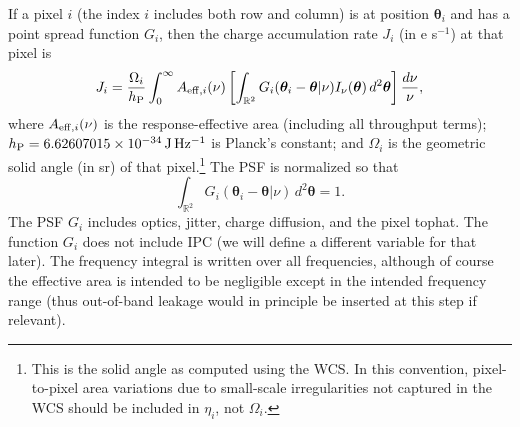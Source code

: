 \documentclass[prd,onecolumn,nofootinbib,nobibnotes]{revtex4}
\begin{document}
If a pixel $i$ (the index $i$ includes both row and column) is at position ${\boldsymbol\theta}_i$ and has a point spread function $G_i$, then the charge accumulation rate $J_i$ (in e s$^{-1}$) at that pixel is
\begin{equation}
J_i = \frac{\Omega_i}{h_{\rm P}} \int_0^\infty A_{{\rm eff},i}(\nu) \left[ \int_{{\mathbb R}^2} G_i({\boldsymbol\theta}_i-{\boldsymbol\theta}|\nu) I_\nu({\boldsymbol\theta})\, d^2{\boldsymbol\theta} \right] \frac{d\nu}\nu,
\label{eq:dot-Q}
\end{equation}
where $A_{{\rm eff},i}(\nu)$ is the response-effective area (including all throughput terms); $h_{\rm P} = 6.62607015\times 10^{-34}\,{\rm J\,Hz}{^{-1}}$ is Planck's constant; and $\Omega_i$ is the geometric solid angle (in sr) of that pixel.\footnote{This is the solid angle as computed using the WCS. In this convention, pixel-to-pixel area variations due to small-scale irregularities not captured in the WCS should be included in $\eta_i$, not $\Omega_i$.} The PSF is normalized so that
\begin{equation}
\int_{{\mathbb R}^2} G_i({\boldsymbol\theta}_i-{\boldsymbol\theta}|\nu) \, d^2{\boldsymbol\theta} = 1.
\end{equation}
The PSF $G_i$ includes optics, jitter, charge diffusion, and the pixel tophat. The function $G_i$ does not include IPC (we will define a different variable for that later). The frequency integral is written over all frequencies, although of course the effective area is intended to be negligible except in the intended frequency range (thus out-of-band leakage would in principle be inserted at this step if relevant).
\end{document}
